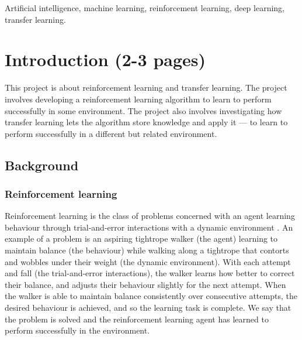 \documentclass[12pt,a4paper]{article}
\begin{document}
\begin{keywords}
Artificial intelligence, machine learning, reinforcement learning, deep learning, transfer learning.
\end{keywords}

\newpage
\section{Introduction (2-3 pages)}
This project is about reinforcement learning and transfer learning. The project involves developing a reinforcement learning algorithm to learn to perform successfully in some environment. The project also involves investigating how transfer learning lets the algorithm store knowledge and apply it --- to learn to perform successfully in a different but related environment.

\subsection{Background} 
\subsubsection{Reinforcement learning}
Reinforcement learning is the class of problems concerned with an agent learning behaviour through trial-and-error interactions with a dynamic environment \cite{Kaelbling1996}. An example of a problem is an aspiring tightrope walker (the agent) learning to maintain balance (the behaviour) while walking along a tightrope that contorts and wobbles under their weight (the dynamic environment). With each attempt and fall (the trial-and-error interactions), the walker learns how better to correct their balance, and adjusts their behaviour slightly for the next attempt. When the walker is able to maintain balance consistently over consecutive attempts, the desired behaviour is achieved, and so the learning task is complete. We say that the problem is solved and the reinforcement learning agent has learned to perform successfully in the environment.  
\end{document}
